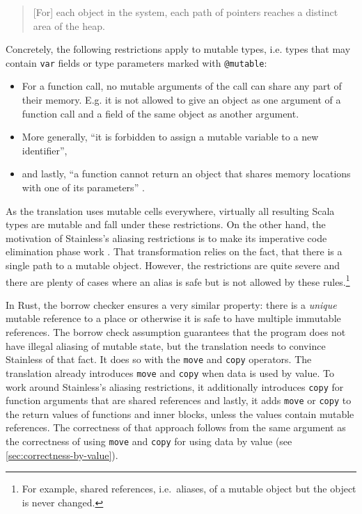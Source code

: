 \begin{quote}
{[}For{]} each object in the system, each path of pointers reaches a
distinct area of the heap. \cite[p.~59]{regb}
\end{quote}

Concretely, the following restrictions apply to mutable types, i.e. types that
may contain \lstinline!var! fields or type parameters marked with
\lstinline!@mutable!:

\begin{itemize}
\tightlist
\item For a function call, no mutable arguments of the call can share
any part of their memory. E.g. it is not allowed to give an object as one
argument of a function call and a field of the same object as another argument.

\item
  More generally, ``it is forbidden to assign a mutable variable to a
  new identifier'',
\item
  and lastly, ``a function cannot return an object that shares memory
  locations with one of its parameters'' \cite[p.~59]{regb}.
\end{itemize}

As the translation uses mutable cells everywhere, virtually all resulting Scala
types are mutable and fall under these restrictions. On the other hand, the
motivation of Stainless's aliasing restrictions is to make its imperative code
elimination phase work \cite{regb}. That transformation relies on the fact, that
there is a single path to a mutable object. However, the restrictions are quite
severe and there are plenty of cases where an alias is safe but is not allowed
by these rules.\footnote{For example, shared references, i.e.~aliases, of a
mutable object but the object is never changed.}

In Rust, the borrow checker ensures a very similar property: there is a
\emph{unique} mutable reference to a place or otherwise it is safe to have
multiple immutable references. The borrow check assumption guarantees that the
program does not have illegal aliasing of mutable state, but the translation
needs to convince Stainless of that fact. It does so with the \lstinline!move!
and \lstinline!copy! operators. The translation already introduces
\lstinline!move! and \lstinline!copy! when data is used by value. To work around
Stainless's aliasing restrictions, it additionally introduces \lstinline!copy!
for function arguments that are shared references and lastly, it adds
\lstinline!move! or \lstinline!copy! to the return values of functions and inner
blocks, unless the values contain mutable references. The correctness of that
approach follows from the same argument as the correctness of using
\lstinline!move! and \lstinline!copy! for using data by value (see
\autoref{sec:correctness-by-value}).

